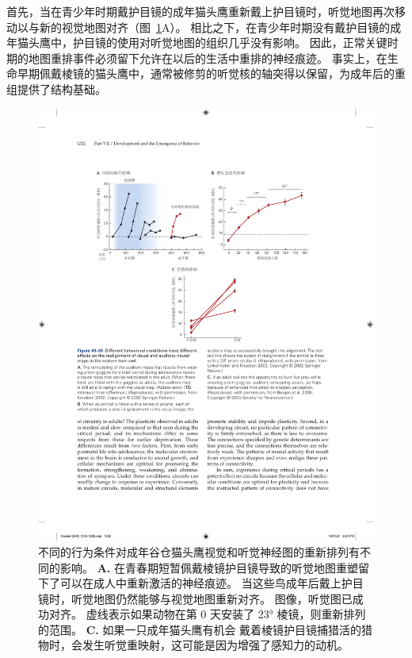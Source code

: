 首先，当在青少年时期戴护目镜的成年猫头鹰重新戴上护目镜时，听觉地图再次移动以与新的视觉地图对齐（图~\ref{fig:49_20}A）。
相比之下，在青少年时期没有戴护目镜的成年猫头鹰中，护目镜的使用对听觉地图的组织几乎没有影响。
因此，正常关键时期的地图重排事件必须留下允许在以后的生活中重排的神经痕迹。
事实上，在生命早期佩戴棱镜的猫头鹰中，通常被修剪的听觉核的轴突得以保留，为成年后的重组提供了结构基础。


\begin{figure}[htbp]
	\centering
	\includegraphics[width=1.0\linewidth]{chap49/fig_49_20}
	\caption{不同的行为条件对成年谷仓猫头鹰视觉和听觉神经图的重新排列有不同的影响。
		\textbf{A.} 在青春期短暂佩戴棱镜护目镜导致的听觉地图重塑留下了可以在成人中重新激活的神经痕迹。
		当这些鸟成年后戴上护目镜时，听觉地图仍然能够与视觉地图重新对齐。
		图像，听觉图已成功对齐。
		虚线表示如果动物在第 0 天安装了 23° 棱镜，则重新排列的范围。
		\textbf{C.} 如果一只成年猫头鹰有机会 戴着棱镜护目镜捕猎活的猎物时，会发生听觉重映射，这可能是因为增强了感知力的动机。}
	\label{fig:49_20}
\end{figure}


